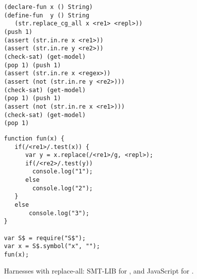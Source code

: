 \begin{figure}[tb]
  \scriptsize

  \begin{minipage}{0.49\linewidth}
\begin{verbatim}
(declare-fun x () String)
(define-fun  y () String
   (str.replace_cg_all x <re1> <repl>))
(push 1)
(assert (str.in.re x <re1>))
(assert (str.in.re y <re2>))
(check-sat) (get-model)
(pop 1) (push 1)
(assert (str.in.re x <regex>))
(assert (not (str.in.re y <re2>)))
(check-sat) (get-model)
(pop 1) (push 1)
(assert (not (str.in.re x <re1>)))
(check-sat) (get-model)
(pop 1)
\end{verbatim}
  \end{minipage}\hfill
  \raisebox{-19ex}{\rule{0.4pt}{39.5ex}}\hfill
  \begin{minipage}{0.49\linewidth}
\begin{verbatim}
function fun(x) {
   if(/<re1>/.test(x)) {
      var y = x.replace(/<re1>/g, <repl>);
      if(/<re2>/.test(y))
        console.log("1");
      else
        console.log("2");
   }
   else
       console.log("3");
}

var S$ = require("S$");
var x = S$.symbol("x", "");
fun(x);
\end{verbatim}
  \end{minipage}
  
  \caption{Harnesses with replace-all: SMT-LIB for \ostrich,
    and JavaScript for \expose{}.}
  \label{fig:harness}
\end{figure}

